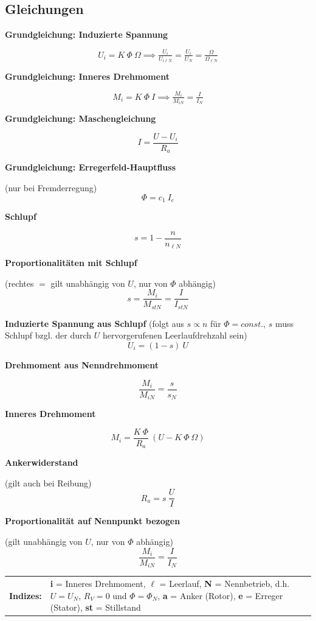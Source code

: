 \documentclass[a4paper, 11pt]{article}
\newcommand{\fancyformula}[2]{
	\small
	\raggedright\sffamily\textbf{#1}
	#2
}
\begin{document}
\subsection*{Gleichungen}
\begin{multicols}{2}
\fancyformula{Grundgleichung: Induzierte Spannung}{
	\[
		U_i = K ~ \Phi ~ \Omega \implies \tfrac{U_i}{U_{i \ell N}} = \tfrac{U_i}{U_N} = \tfrac{\Omega}{\Omega_{\ell N}}
	\]
}

\fancyformula{Grundgleichung: Inneres Drehmoment}{
	\[
		M_i = K ~ \Phi ~ I \implies \tfrac{M_i}{M_{iN}} = \tfrac{I}{I_N}
	\]
}

\fancyformula{Grundgleichung: Maschengleichung}{
	\[
		I = \frac{U - U_i}{R_a}
	\]
}

\fancyformula{Grundgleichung: Erregerfeld-Hauptfluss}{
	(nur bei Fremderregung)
	\[
		\Phi = c_1 ~ I_e
	\]
}

\fancyformula{Schlupf}{
	\[
		s = 1 - \frac{n}{n_{\ell N}}
	\]
}

\fancyformula{Proportionalitäten mit Schlupf}{
	(rechtes $=$ gilt unabhängig von $U$, nur von $\Phi$ abhängig)
	\[
		s = \frac{M_i}{M_{stN}} = \frac{I}{I_{stN}}
	\]
}

\fancyformula{Induzierte Spannung aus Schlupf}{(folgt aus $s \propto n$ für $\Phi = const.$, $s$ muss Schlupf bzgl. der durch $U$ hervorgerufenen Leerlaufdrehzahl sein)
	\[
		U_i = (1 - s) ~ U
	\]
}

\fancyformula{Drehmoment aus Nenndrehmoment}{
	\[
		\frac{M_i}{M_{iN}} = \frac{s}{s_N}
	\]
}

\fancyformula{Inneres Drehmoment}{
	\[
		M_i = \frac{K ~ \Phi}{R_a} ~ (U - K ~ \Phi ~ \Omega)
	\]
}

\fancyformula{Ankerwiderstand}{
	(gilt auch bei Reibung)
	\[
		R_a = s ~ \frac{U}{I}
	\]
}

\fancyformula{Proportionalität auf Nennpunkt bezogen}{
	(gilt unabhängig von $U$, nur von $\Phi$ abhängig)
	\[
		\frac{M_i}{M_{iN}} = \frac{I}{I_N}
	\]
}
\end{multicols}

\raggedright
\vspace{12pt}
\footnotesize
\begin{tabular}{r p{13cm}}
	\sffamily\textbf{Indizes:} & \rmfamily \textbf{i} = Inneres Drehmoment, \textbf{$\ell$} = Leerlauf, \textbf{N} = Nennbetrieb, d.h. $U = U_N$, $R_V = 0$ und $\Phi = \Phi_N$, \textbf{a} = Anker (Rotor), \textbf{e} = Erreger (Stator), \textbf{st} = Stillstand
\end{tabular}
\normalsize
\end{document}
